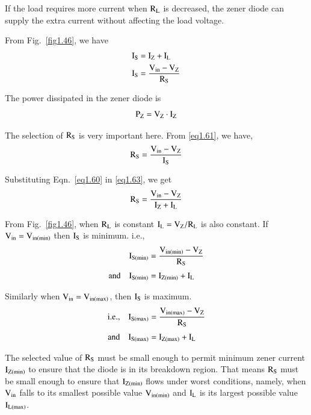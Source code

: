 If the load requires more current when $\textrm{R}_{\textrm{L}}$ is decreased, the zener diode can supply the extra current without affecting the load voltage.

From Fig.~\ref{fig1.46}, we have
\begin{align}
& \textrm{I}_{\textrm{S}} =\textrm{I}_{\textrm{Z}}+\textrm{I}_{\textrm{L}}\label{eq1.60}\\
& \textrm{I}_{\textrm{S}} =\frac{\textrm{V}_{\text{in}}-\textrm{V}_{\textrm{Z}}}{\textrm{R}_{\textrm{S}}}\label{eq1.61}
\end{align}

The power dissipated in the zener diode is
\begin{equation}
\textrm{P}_{\textrm{Z}}=\textrm{V}_{\textrm{Z}}\cdot \textrm{I}_{\textrm{Z}}\label{eq1.62}
\end{equation}

The selection of $\textrm{R}_{\textrm{S}}$ is very important here. From \eqref{eq1.61}, we have,
\begin{equation}
\textrm{R}_{\textrm{S}}=\frac{\textrm{V}_{\text{in}}-\textrm{V}_{\textrm{Z}}}{\textrm{I}_{\textrm{S}}}\label{eq1.63}
\end{equation}

Substituting Eqn.~\eqref{eq1.60} in \eqref{eq1.63}, we get
\begin{equation}
\textrm{R}_{\textrm{S}}=\frac{\textrm{V}_{\text{in}}-\textrm{V}_{\textrm{Z}}}{\textrm{I}_{\textrm{Z}}+\textrm{I}_{\textrm{L}}}\label{eq1.64}
\end{equation}

From Fig.~\ref{fig1.46}, when $\textrm{R}_{\textrm{L}}$ is constant $\textrm{I}_{\textrm{L}}=\textrm{V}_{\textrm{Z}}/\textrm{R}_{\textrm{L}}$ is also constant. If $\textrm{V}_{\text{in}}=\textrm{V}_{\text{in}(\min)}$ then $\textrm{I}_{\textrm{S}}$ is minimum. i.e.,
\begin{align}
\textrm{I}_{\textrm{S}(\min)} &= \frac{\textrm{V}_{\text{in}(\min)}-\textrm{V}_{\textrm{Z}}}{\textrm{R}_{\textrm{S}}}\label{eq1.65}\\[3pt]
\text{and}\quad \textrm{I}_{\textrm{S}(\min)} &= \textrm{I}_{\textrm{Z}(\min)}+\textrm{I}_{\textrm{L}}\label{eq1.66}
\end{align}

Similarly when $\textrm{V}_{\text{in}}=\textrm{V}_{\text{in}(\max)}$, then $\textrm{I}_{\textrm{S}}$ is maximum.
\begin{align}
\text{i.e.,}\quad \textrm{I}_{\textrm{S}(\max)} &= \frac{\textrm{V}_{\text{in}(\max)}-\textrm{V}_{\textrm{Z}}}{\textrm{R}_{\textrm{S}}}\label{eq1.67}\\[3pt]
\text{and}\quad \textrm{I}_{\textrm{S}(\max)} &= \textrm{I}_{\textrm{Z}(\max)}+\textrm{I}_{\textrm{L}}\label{eq1.68}
\end{align}

The selected value of $\textrm{R}_{\textrm{S}}$ must be small enough to permit minimum zener current $\textrm{I}_{\textrm{Z}(\min)}$ to ensure that the diode is in its breakdown region. That means $\textrm{R}_{\textrm{S}}$ must be small enough to ensure that $\textrm{I}_{\textrm{Z}(\min)}$ flows under worst conditions, namely, when $\textrm{V}_{\text{in}}$ falls to its smallest possible value $\textrm{V}_{\text{in}(\min)}$ and $\textrm{I}_{\textrm{L}}$ is its largest possible value $\textrm{I}_{\textrm{L}(\max)}$.

